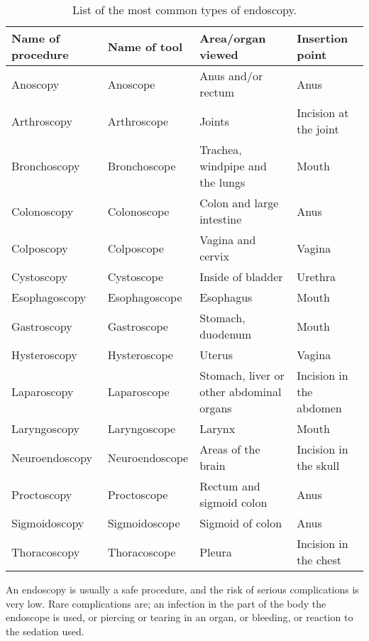 \documentclass[thesis.tex]{subfiles}
\begin{document}
\begin{table} %
  \centering
  \begin{tabular}{ l l l l}
  	\hline
    Name of procedure	&Name of tool	&Area/organ viewed	&Insertion point	\\
    \hline
    Anoscopy			&Anoscope		&Anus and/or rectum	&Anus				\\
    Arthroscopy			&Arthroscope	&Joints				&Incision at the joint\\ 
    Bronchoscopy		&Bronchoscope	&Trachea, windpipe
    										and the lungs	&Mouth				\\ 
    Colonoscopy			&Colonoscope	&Colon and large
    										intestine		&Anus				\\				
    Colposcopy			&Colposcope		&Vagina and cervix	&Vagina				\\
    Cystoscopy			&Cystoscope		&Inside of bladder	&Urethra			\\
    Esophagoscopy		&Esophagoscope	&Esophagus			&Mouth				\\
    Gastroscopy			&Gastroscope	&Stomach, duodenum	&Mouth				\\
    Hysteroscopy		&Hysteroscope	&Uterus				&Vagina				\\
    Laparoscopy			&Laparoscope	&Stomach, liver or
    									other abdominal organs	&Incision in the abdomen \\
    Laryngoscopy		&Laryngoscope	&Larynx				&Mouth				\\
    Neuroendoscopy		&Neuroendoscope	&Areas of the brain	&Incision in the skull \\
    Proctoscopy			&Proctoscope	&Rectum and sigmoid
    										colon			&Anus				\\
    Sigmoidoscopy		&Sigmoidoscope	&Sigmoid of colon	&Anus				\\
    Thoracoscopy		&Thoracoscope	&Pleura				&Incision in the chest \\
    \hline
  \end{tabular}
  \caption[List of the most common types of endoscopy.]{List of the most common types of endoscopy.}
  \label{tab:endoscope_types}
\end{table}


\noindent
An endoscopy is usually a safe procedure, and the risk of serious complications is very low. Rare complications are; an infection in the part of the body the endoscope is used, or piercing or tearing in an organ, or bleeding, or reaction to the sedation used.
\end{document}

